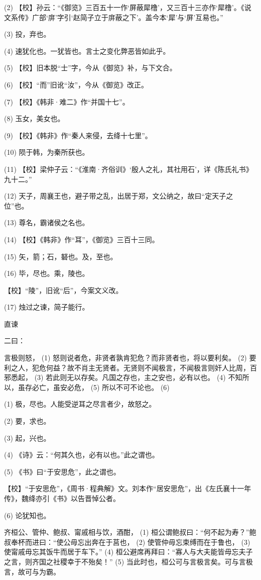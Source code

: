 \documentclass[12pt,UTF8]{ctexbook}
\begin{document}
(2) 【校】孙云：“《御览》三百五十一作‘屏蔽犀橹’，又三百十三亦作‘犀橹’。《说文系传》广部‘庰’字引‘赵简子立于庰蔽之下’。盖今本‘犀’与‘屏’互易也。”

(3) 投，弃也。

(4) 速犹化也。一犹皆也。言士之变化弊恶皆如此乎。

(5) 【校】旧本脱“士”字，今从《御览》补，与下文合。

(6) 【校】“而”旧讹“汝”，今从《御览》改正。

(7) 【校】《韩非·难二》作“并国十七”。

(8) 玉女，美女也。

(9) 【校】《韩非》作“秦人来侵，去绛十七里”。

(10) 陨于韩，为秦所获也。

(11) 【校】梁仲子云：“《淮南·齐俗训》‘殷人之礼，其社用石’，详《陈氏礼书》九十二。”

(12) 天子，周襄王也，避子带之乱，出居于郑，文公纳之，故曰“定天子之位”也。

(13) 尊名，霸诸侯之名也。

(14) 【校】《韩非》作“耳”，《御览》三百十三同。

(15) 矢，箭；石，砮也。及，至也。

(16) 毕，尽也。乘，陵也。

【校】“陵”，旧讹“后”，今案文义改。

(17) 烛过之谏，简子能行。





直谏


二曰：

言极则怒， (1) 怒则说者危，非贤者孰肯犯危？而非贤者也，将以要利矣。 (2) 要利之人，犯危何益？故不肖主无贤者。无贤则不闻极言，不闻极言则奸人比周，百邪悉起， (3) 若此则无以存矣。凡国之存也，主之安也，必有以也。 (4) 不知所以，虽存必亡，虽安必危， (5) 所以不可不论也。 (6)

(1) 极，尽也。人能受逆耳之尽言者少，故怒之。

(2) 要，求也。

(3) 起，兴也。

(4) 《诗》云：“何其久也，必有以也。”此之谓也。

(5) 《书》曰“于安思危”，此之谓也。

【校】“于安思危”，《周书·程典解》文。刘本作“居安思危”，出《左氏襄十一年传》，魏绛亦引《书》以告晋悼公者。

(6) 论犹知也。

齐桓公、管仲、鲍叔、甯戚相与饮，酒酣， (1) 桓公谓鲍叔曰：“何不起为寿？”鲍叔奉杯而进曰：“使公毋忘出奔在于莒也， (2) 使管仲毋忘束缚而在于鲁也， (3) 使甯戚毋忘其饭牛而居于车下。” (4) 桓公避席再拜曰：“寡人与大夫能皆毋忘夫子之言，则齐国之社稷幸于不殆矣！” (5) 当此时也，桓公可与言极言矣。可与言极言，故可与为霸。
\end{document}
